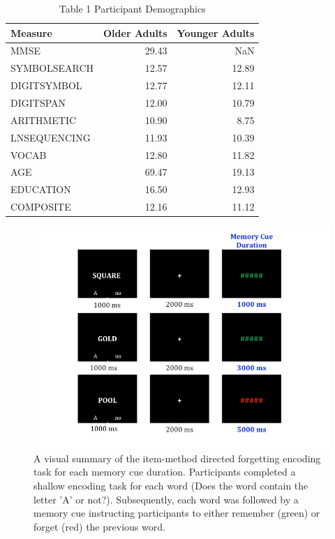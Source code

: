 \documentclass[man]{apa6}\usepackage[]{graphicx}\usepackage[]{color}
\newenvironment{knitrout}{}{} %
\begin{document}
\begin{knitrout}
\color{fgcolor}\begin{table}

\caption{\label{tab:print_table}Table 1 Participant Demographics}
\centering
\begin{tabular}[t]{l|r|r}
\hline
Measure & Older Adults & Younger Adults\\
\hline
MMSE & 29.43 & NaN\\
\hline
SYMBOLSEARCH & 12.57 & 12.89\\
\hline
DIGITSYMBOL & 12.77 & 12.11\\
\hline
DIGITSPAN & 12.00 & 10.79\\
\hline
ARITHMETIC & 10.90 & 8.75\\
\hline
LNSEQUENCING & 11.93 & 10.39\\
\hline
VOCAB & 12.80 & 11.82\\
\hline
AGE & 69.47 & 19.13\\
\hline
EDUCATION & 16.50 & 12.93\\
\hline
COMPOSITE & 12.16 & 11.12\\
\hline
\end{tabular}
\end{table}


\end{knitrout}

\begin{figure}
    \centering
    \includegraphics[width=\textwidth]{Slide1.jpg}
    \caption{A visual summary of the item-method directed forgetting encoding task for each memory cue duration. Participants completed a shallow encoding task for each word (Does the word contain the letter 'A' or not?). Subsequently, each word was followed by a memory cue instructing participants to either remember (green) or forget (red) the previous word.}
    \label{fig:Figure 1}
\end{figure}
\end{document}
